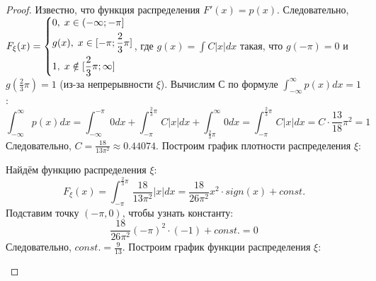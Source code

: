 \begin{proof}
	Известно, что функция распределения $F'(x) = p(x)$. Следовательно, $F_\xi(x) =
	\begin{dcases}
		0, \; x \in (-\infty;-\pi]\\
		g(x), \; x \in [-\pi;\frac{2}{3}\pi]\\
		1, \; x \notin [\frac{2}{3}\pi;\infty]
	\end{dcases}$, где $g(x) = \int C|x| dx$ такая, что $g(-\pi) = 0$ и $g(\frac{2}{3}\pi) = 1$ (из-за непрерывности $\xi$).
	\newline
	Вычислим С по формуле $\int_{-\infty}^{\infty} p(x) dx = 1$:
	\[
		\int_{-\infty}^{\infty} p(x) dx = \int_{-\infty}^{-\pi} 0 dx + \int_{-\pi}^{\frac{2}{3}\pi} C|x| dx + \int_{\frac{2}{3}\pi}^{\infty} 0 dx = \int_{-\pi}^{\frac{2}{3}\pi} C|x| dx = C \cdot \frac{13}{18}\pi^2 = 1
	\]
	Следовательно, $C = \frac{18}{13\pi^2} \approx 0.44074$.
	\newline
	Построим график плотности распределения $\xi$:
	\begin{center}
	\end{center}
	Найдём функцию распределения $\xi$:
	\[
		F_\xi(x) = \int_{-\pi}^{\frac{2}{3}\pi} \frac{18}{13\pi^2} |x| dx = \frac{18}{26\pi^2} x^2 \cdot sign(x) + const.
	\]
	Подставим точку $(-\pi, 0)$, чтобы узнать константу:
	\[
		\frac{18}{26\pi^2} (-\pi)^2 \cdot (-1) + const. = 0
	\]
	Следовательно, $const. = \frac{9}{13}$.
	\newline
	Построим график функции распределения $\xi$:
	\begin{center}
\end{center}
\end{proof}
